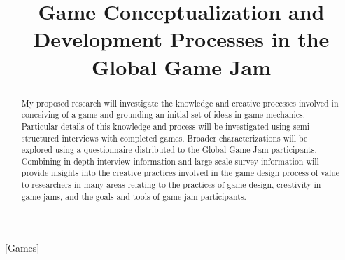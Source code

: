 \documentclass{sig-alternate}
\begin{document}

\title{Game Conceptualization and Development Processes in the Global Game Jam}

\author{}

\maketitle
\begin{abstract}
My proposed research will investigate the knowledge and creative processes involved in conceiving of a game and grounding an initial set of ideas in game mechanics. Particular details of this knowledge and process will be investigated using semi-structured interviews with completed games. Broader characterizations will be explored using a questionnaire distributed to the Global Game Jam participants. Combining in-depth interview information and large-scale survey information will provide insights into the creative practices involved in the game design process of value to researchers in many areas relating to the practices of game design, creativity in game jams, and the goals and tools of game jam participants.
\end{abstract}

[Games]
\end{document}
